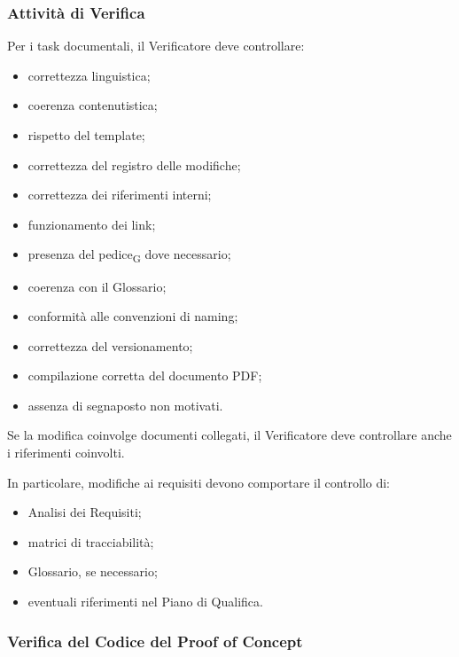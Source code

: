 
\subsubsection{Attività di Verifica}

Per i task documentali, il Verificatore deve controllare:

\begin{itemize}
    \item correttezza linguistica;
    \item coerenza contenutistica;
    \item rispetto del template;
    \item correttezza del registro delle modifiche;
    \item correttezza dei riferimenti interni;
    \item funzionamento dei link;
    \item presenza del pedice\textsubscript{G} dove necessario;
    \item coerenza con il Glossario;
    \item conformità alle convenzioni di naming;
    \item correttezza del versionamento;
    \item compilazione corretta del documento PDF;
    \item assenza di segnaposto non motivati.
\end{itemize}

Se la modifica coinvolge documenti collegati, il Verificatore deve controllare
anche i riferimenti coinvolti.

In particolare, modifiche ai requisiti devono comportare il controllo di:

\begin{itemize}
    \item Analisi dei Requisiti;
    \item matrici di tracciabilità;
    \item Glossario, se necessario;
    \item eventuali riferimenti nel Piano di Qualifica.
\end{itemize}


\subsubsection{Verifica del Codice del Proof of Concept}

